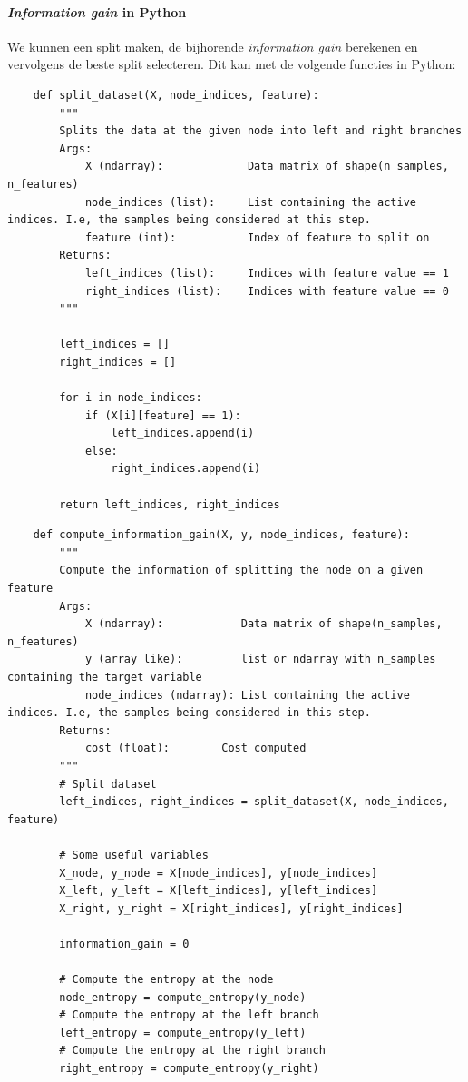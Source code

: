 \paragraph{\textit{Information gain} in Python}

We kunnen een split maken, de bijhorende \textit{information gain} berekenen en vervolgens de beste split selecteren. Dit kan met de volgende functies in Python:

\begin{lstlisting}
	def split_dataset(X, node_indices, feature):
	    """
	    Splits the data at the given node into left and right branches
	    Args:
	        X (ndarray):             Data matrix of shape(n_samples, n_features)
	        node_indices (list):     List containing the active indices. I.e, the samples being considered at this step.
	        feature (int):           Index of feature to split on
	    Returns:
	        left_indices (list):     Indices with feature value == 1
	        right_indices (list):    Indices with feature value == 0
	    """
	
	    left_indices = []
	    right_indices = []
	
	    for i in node_indices:
	        if (X[i][feature] == 1):
	            left_indices.append(i) 
	        else: 
	            right_indices.append(i)
	
	    return left_indices, right_indices
\end{lstlisting}

\begin{lstlisting}
	def compute_information_gain(X, y, node_indices, feature):
	    """
	    Compute the information of splitting the node on a given feature
	    Args:
	        X (ndarray):            Data matrix of shape(n_samples, n_features)
	        y (array like):         list or ndarray with n_samples containing the target variable
	        node_indices (ndarray): List containing the active indices. I.e, the samples being considered in this step.
	    Returns:
	        cost (float):        Cost computed
	    """
	    # Split dataset
	    left_indices, right_indices = split_dataset(X, node_indices, feature)
	
	    # Some useful variables
	    X_node, y_node = X[node_indices], y[node_indices]
	    X_left, y_left = X[left_indices], y[left_indices]
	    X_right, y_right = X[right_indices], y[right_indices]
	
	    information_gain = 0
	
	    # Compute the entropy at the node
	    node_entropy = compute_entropy(y_node)
	    # Compute the entropy at the left branch
	    left_entropy = compute_entropy(y_left)
	    # Compute the entropy at the right branch
	    right_entropy = compute_entropy(y_right)
\end{lstlisting}

